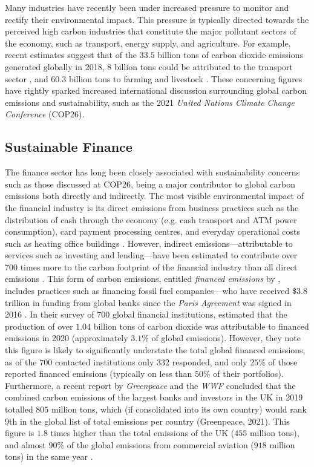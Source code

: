 \documentclass[a4paper, 11pt]{report}
\begin{document}
    Many industries have recently been under increased pressure to monitor and rectify their environmental impact. This pressure is typically directed towards the perceived high carbon industries that constitute the major pollutant sectors of the economy, such as transport, energy supply, and agriculture. For example, recent estimates suggest that of the $33.5$ billion tons of carbon dioxide emissions generated globally in 2018, $8$ billion tons could be attributed to the transport sector \citep{iea-2022}, and $60.3$ billion tons to farming and livestock \citep{ahmad-2022}. These concerning figures have rightly sparked increased international discussion surrounding global carbon emissions and sustainability, such as the 2021 \emph{United Nations Climate Change Conference} (COP26).


    \subsection{Sustainable Finance}

    The finance sector has long been closely associated with sustainability concerns such as those discussed at COP26, being a major contributor to global carbon emissions both directly and indirectly. The most visible environmental impact of the financial industry is its direct emissions from business practices such as the distribution of cash through the economy (e.g. cash transport and ATM power consumption), card payment processing centres, and everyday operational costs such as heating office buildings \citep{hanegraaf-2018}. However, indirect emissions---attributable to services such as investing and lending---have been estimated to contribute over 700 times more to the carbon footprint of the financial industry than all direct emissions \citep{power-2020}. This form of carbon emissions, entitled \emph{financed emissions} by \citet{power-2020}, includes practices such as financing fossil fuel companies---who have received \$3.8 trillion in funding from global banks since the \emph{Paris Agreement} was signed in 2016 \citep{rainforest-2021}. In their survey of $700$ global financial institutions, \citet{power-2020} estimated that the production of over $1.04$ billion tons of carbon dioxide was attributable to financed emissions in 2020 (approximately $3.1\%$ of global emissions). However, they note this figure is likely to significantly understate the total global financed emissions, as of the $700$ contacted institutions only $332$ responded, and only $25\%$ of those reported financed emissions (typically on less than $50\%$ of their portfolios). Furthermore, a recent report by \emph{Greenpeace} and the \emph{WWF} concluded that the combined carbon emissions of the largest banks and investors in the UK in 2019 totalled $805$ million tons, which (if consolidated into its own country) would rank 9th in the global list of total emissions per country (Greenpeace, 2021). This figure is $1.8$ times higher than the total emissions of the UK ($455$ million tons), and almost $90\%$ of the global emissions from commercial aviation ($918$ million tons) in the same year \citep{graver-2020}.
\end{document}
